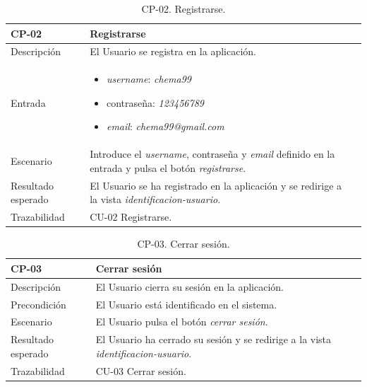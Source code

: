 \begin{table}[H]
    \centering
    \begin{tabularx}{1\textwidth} { 
        | >{\raggedright\arraybackslash}X 
        | >{\raggedright\arraybackslash}X 
        | >{\raggedright\arraybackslash}X 
        |  }
    \hline
    \textbf{CP-02}     & \textbf{Registrarse}                             \\ \hline
    Descripción        & El Usuario se registra en la aplicación.      \\ \hline
    Entrada            & \begin{itemize}
        \item \textit{username}: \textit{chema99}
        \item contraseña: \textit{123456789}
        \item \textit{email}: \textit{chema99@gmail.com}
    \end{itemize}\\ \hline
    Escenario          & Introduce el \textit{username}, contraseña y \textit{email} definido en la entrada y pulsa el botón \textit{registrarse}.                            \\ \hline
   
    Resultado esperado & El Usuario se ha registrado en la aplicación y se redirige a la vista \textit{identificacion-usuario}. \\ \hline
    Trazabilidad & CU-02 Registrarse. \\ \hline
    \end{tabularx}
    \caption{CP-02. Registrarse.}
    \label{table:CP-02}
    \end{table}


   


        \begin{table}[H]
            \centering
            \begin{tabularx}{1\textwidth} { 
                | >{\raggedright\arraybackslash}X 
                | >{\raggedright\arraybackslash}X 
                | >{\raggedright\arraybackslash}X 
                |  }
            \hline
            \textbf{CP-03}     & \textbf{Cerrar sesión}                             \\ \hline
            Descripción        & El Usuario cierra su sesión en la aplicación.      \\ \hline
            
            Precondición          & El Usuario está identificado en el sistema.                             \\ \hline
            Escenario          & El Usuario pulsa el botón \textit{cerrar sesión}.                             \\ \hline
            Resultado esperado & El Usuario ha cerrado su sesión y se redirige a la vista \textit{identificacion-usuario}. \\ \hline
            Trazabilidad & CU-03 Cerrar sesión. \\ \hline
        \end{tabularx}
        \caption{CP-03. Cerrar sesión.}
        \label{table:CP-03}
            \end{table}


